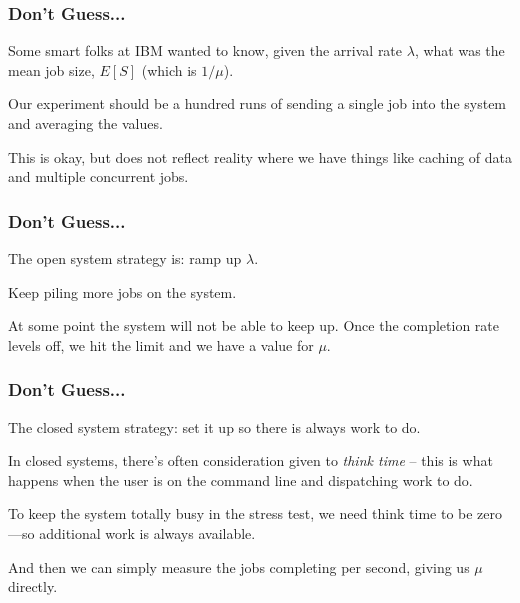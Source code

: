 \begin{frame}
\frametitle{Don't Guess...}
Some smart folks at IBM wanted to know, given the arrival rate $\lambda$, what was the mean job size, $E[S]$ (which is $1/\mu$). 

Our experiment should be a hundred runs of sending a single job into the system and averaging the values. 

This is okay, but does not reflect reality where we have things like caching of data and multiple concurrent jobs. 

\end{frame}



\begin{frame}
\frametitle{Don't Guess...}

The open system strategy is: ramp up $\lambda$. 

Keep piling more jobs on the system. 

At some point the system will not be able to keep up. Once the completion rate levels off, we hit the limit and we have a value for $\mu$.


\end{frame}



\begin{frame}
\frametitle{Don't Guess...}

The closed system strategy: set it up so there is always work to do. 

In closed systems, there's often consideration given to \textit{think time} -- this is what happens when the user is on the command line and dispatching work to do. 

To keep the system totally busy in the stress test, we need think time to be zero---so additional work is always available. 

And then we can simply measure the jobs completing per second, giving us $\mu$ directly.


\end{frame}






